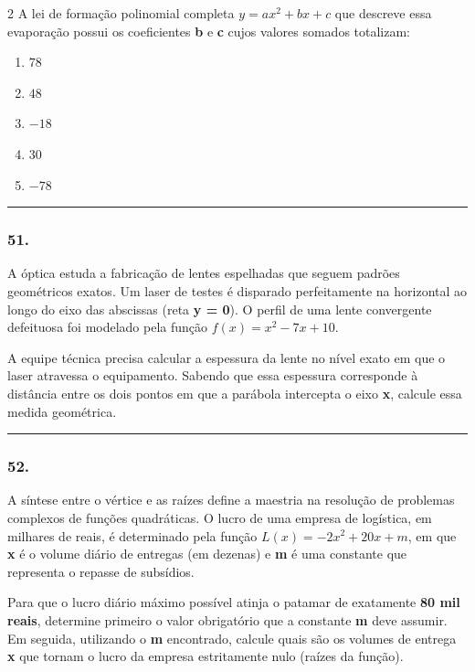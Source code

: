 \documentclass[twoside, 10pt, a4paper]{article}
\newlength{\espacoPreQuestao}
\newlength{\espacoQuestao}
\begin{document}
\begin{multicols*}{2}
A lei de formação polinomial completa $y = ax^2 + bx + c$ que descreve essa evaporação possui os coeficientes \textbf{b} e \textbf{c} cujos valores somados totalizam:

\begin{enumerate}[label=\alph*)]
    \item $78$
    \item $48$
    \item $-18$
    \item $30$
    \item $-78$
\end{enumerate}
\par\vspace{\espacoQuestao}

\noindent\textcolor{CorLinha}{\rule{\linewidth}{0.5pt}} 
\par\vspace{\espacoPreQuestao}
\subsubsection*{51.} A óptica estuda a fabricação de lentes espelhadas que seguem padrões geométricos exatos. Um laser de testes é disparado perfeitamente na horizontal ao longo do eixo das abscissas (reta \textbf{y = 0}). O perfil de uma lente convergente defeituosa foi modelado pela função $f(x) = x^2 - 7x + 10$.

A equipe técnica precisa calcular a espessura da lente no nível exato em que o laser atravessa o equipamento. Sabendo que essa espessura corresponde à distância entre os dois pontos em que a parábola intercepta o eixo \textbf{x}, calcule essa medida geométrica.
\par\vspace{\espacoQuestao}

\noindent\textcolor{CorLinha}{\rule{\linewidth}{0.5pt}} 
\par\vspace{\espacoPreQuestao}
\subsubsection*{52.} A síntese entre o vértice e as raízes define a maestria na resolução de problemas complexos de funções quadráticas. O lucro de uma empresa de logística, em milhares de reais, é determinado pela função $L(x) = -2x^2 + 20x + m$, em que \textbf{x} é o volume diário de entregas (em dezenas) e \textbf{m} é uma constante que representa o repasse de subsídios.

Para que o lucro diário máximo possível atinja o patamar de exatamente \textbf{80 mil reais}, determine primeiro o valor obrigatório que a constante \textbf{m} deve assumir. Em seguida, utilizando o \textbf{m} encontrado, calcule quais são os volumes de entrega \textbf{x} que tornam o lucro da empresa estritamente nulo (raízes da função).
\par\vspace{\espacoQuestao}

\end{multicols*}
\end{document}
